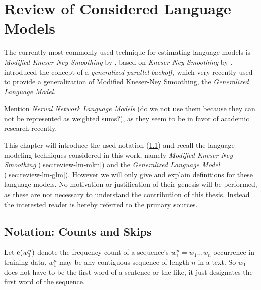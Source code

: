 \chapter{Review of Considered Language Models}
\label{ch:review}

The currently most commonly used \parencite{JurafskyMartin2009,Chelba2013}
technique for estimating language models is \emph{Modified Kneser-Ney Smoothing}
by \textcite{ChenGoodman1996,ChenGoodman1998,ChenGoodman1999}, based on
\emph{Kneser-Ney Smoothing} by \textcite{KneserNey1995}.
\textcite{BilmesKirchhoff2003} introduced the concept of a \emph{generalized
parallel backoff}, which very recently \textcite{Pickhardt2014} used to provide
a generalization of Modified Kneser-Ney Smoothing, the \emph{Generalized
Language Model}.

\begin{draft}
Mention \emph{Nerual Network Language Models} \parencite{Bengio2003,Mikolov2012}
(do we not use them because they can not be represented as weighted sums?), as
they seem to be in favor of academic research recently.
\end{draft}

This chapter will introduce the used notation (\cref{sec:review-notation})
and recall the language modeling techniques considered in this work,
namely \emph{Modified Kneser-Ney Smoothing} (\cref{sec:review-lm-mkn}) and the
\emph{Generalized Language Model} (\cref{sec:review-lm-glm}).
However we will only give and explain definitions for these language models.
No motivation or justification of their genesis will be performed, as these are
not necessary to understand the contribution of this thesis.
Instead the interested reader is hereby referred to the primary sources.


\section{Notation: Counts and Skips}
\label{sec:review-notation}

Let $\operatorname{c}(w_1^n)$ denote the frequency count of a sequence's
$w_1^n = w_1 \ldots w_n$ occurrence in training data.
$w_1^n$ may be any contiguous sequence of length $n$ in a text.
So $w_1$ does not have to be the first word of a sentence or the like,
it just designates the first word of the sequence.

